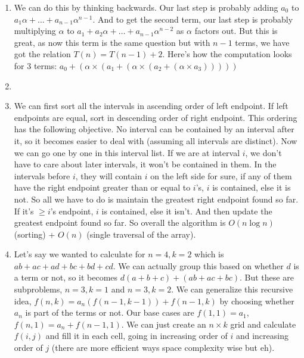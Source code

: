 \documentclass[12pt]{report}
\begin{document}
\begin{enumerate}[label=\textbf{\arabic*.}]
  \item We can do this by thinking backwards. Our last step is probably adding $a_0$ to $a_1 \alpha + \dots + a_{n-1} 
  \alpha^{n-1}$. And to get the second term, our last step is probably multiplying $\alpha$ to $a_1 + a_2 \alpha + \dots 
  + a_{n-1} \alpha^{n-2}$ as $\alpha$ factors out. But this is great, as now this term is the same question but with 
  $n-1$ terms, we have got the relation $T(n) = T(n-1) + 2$. Here's how the computation looks for 3 terms: $a_0 + 
  (\alpha \times (a_1 + (\alpha \times (a_2 + (\alpha \times a_3)))))$
  
  \item 

  \item We can first sort all the intervals in ascending order of left endpoint. If left endpoints are equal, sort in 
  descending order of right endpoint. This ordering has the following objective. No interval can be contained by an interval
  after it, so it becomes easier to deal with (assuming all intervals are distinct). Now we can go one by one in this 
  interval list. If we are at interval $i$, we don't have to care about later intervals, it won't be contained in them.
  In the intervals before $i$, they will contain $i$ on the left side for sure, if any of them have the right endpoint 
  greater than  or equal to $i$'s, $i$ is contained, else it is not. So all we have to do is maintain the greatest right 
  endpoint found so far. If it's $\geq i$'s endpoint, $i$ is contained, else it isn't. And then update the greatest endpoint 
  found so far. So overall the algorithm is $O(n \log n)$ (sorting) + $O(n)$ (single traversal of the array).

  \item Let's say we wanted to calculate for $n = 4, k = 2$ which is $ab + ac + ad + bc + bd + cd$. We can actually group 
  this based on whether $d$ is a term or not, so it becomes $d(a + b + c) + (ab + ac + bc)$. But these are subproblems, $n = 3, k = 1$
  and $n = 3, k = 2$. We can generalize this recursive idea, $f(n, k) = a_n(f(n-1, k-1)) + f(n-1, k)$ by choosing whether 
  $a_n$ is part of the terms or not. Our base cases are $f(1,1) = a_1$, $f(n,1) = a_n + f(n-1,1)$. We can just create an 
  $n \times k$ grid and calculate $f(i,j)$ and fill it in each cell, going in increasing order of $i$ and increasing order 
  of $j$ (there are more efficient ways space complexity wise but eh).
  \end{enumerate}
\end{document}
